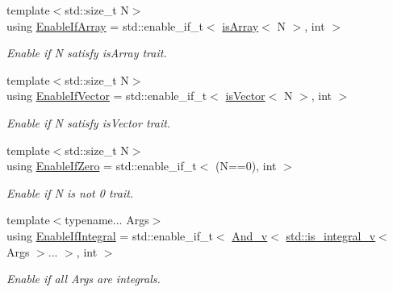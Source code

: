 \begin{DoxyCompactItemize}
\item 
{\footnotesize template$<$std\+::size\+\_\+t N$>$ }\\using \hyperlink{namespacecnt_1_1help_adf9d100b298c3b1342f7571dfbe1e3ac}{Enable\+If\+Array} = std\+::enable\+\_\+if\+\_\+t$<$ \hyperlink{namespacecnt_1_1help_aa31a937cfd47ea6364195d39394f8fde}{is\+Array}$<$ N $>$, int $>$
\begin{DoxyCompactList}\small\item\em Enable if \textquotesingle{}N\textquotesingle{} satisfy \textquotesingle{}is\+Array\textquotesingle{} trait. \end{DoxyCompactList}\item 
{\footnotesize template$<$std\+::size\+\_\+t N$>$ }\\using \hyperlink{namespacecnt_1_1help_ac3c31a0ef3a73ff16367e0c7ae9df545}{Enable\+If\+Vector} = std\+::enable\+\_\+if\+\_\+t$<$ \hyperlink{namespacecnt_1_1help_a5d40a2583c5a58f9f4540ef0518296d5}{is\+Vector}$<$ N $>$, int $>$
\begin{DoxyCompactList}\small\item\em Enable if \textquotesingle{}N\textquotesingle{} satisfy \textquotesingle{}is\+Vector\textquotesingle{} trait. \end{DoxyCompactList}\item 
{\footnotesize template$<$std\+::size\+\_\+t N$>$ }\\using \hyperlink{namespacecnt_1_1help_a59b3cc028ea7b2a640eb6603befae7bf}{Enable\+If\+Zero} = std\+::enable\+\_\+if\+\_\+t$<$ (N==0), int $>$
\begin{DoxyCompactList}\small\item\em Enable if \textquotesingle{}N\textquotesingle{} is not \textquotesingle{}0\textquotesingle{} trait. \end{DoxyCompactList}\item 
{\footnotesize template$<$typename... Args$>$ }\\using \hyperlink{namespacecnt_1_1help_aa87745c6be80922ee43c76953bfc5a74}{Enable\+If\+Integral} = std\+::enable\+\_\+if\+\_\+t$<$ \hyperlink{namespacecnt_1_1help_a502eecdcb745c74d4f7457265b764ef2}{And\+\_\+v}$<$ \hyperlink{namespacestd_a824c5eb1a7e8aafa382dc9af3329a9e8}{std\+::is\+\_\+integral\+\_\+v}$<$ Args $>$... $>$, int $>$
\begin{DoxyCompactList}\small\item\em Enable if all \textquotesingle{}Args\textquotesingle{} are integrals. \end{DoxyCompactList}\item 

\end{DoxyCompactItemize}
